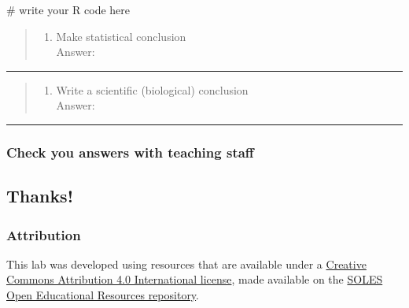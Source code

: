 \documentclass[
  10pt,
  letterpaper,
  DIV=11,
  numbers=noendperiod]{scrartcl}
\newenvironment{Shaded}{\begin{snugshade}}{\end{snugshade}}
\newcommand{\CommentTok}[1]{\textcolor[rgb]{0.37,0.37,0.37}{#1}}
\providecommand{\tightlist}{%
  \setlength{\itemsep}{0pt}\setlength{\parskip}{0pt}}\usepackage{longtable,booktabs,array}
\begin{document}
\begin{Shaded}
\begin{Highlighting}[]
\CommentTok{\# write your R code here}
\end{Highlighting}
\end{Shaded}

\begin{quote}
\begin{enumerate}
\def\labelenumi{\arabic{enumi}.}
\setcounter{enumi}{5}
\tightlist
\item
  Make statistical conclusion\\
  Answer:
\end{enumerate}
\end{quote}

\begin{center}\rule{0.5\linewidth}{0.5pt}\end{center}

\begin{quote}
\begin{enumerate}
\def\labelenumi{\arabic{enumi}.}
\setcounter{enumi}{6}
\tightlist
\item
  Write a scientific (biological) conclusion\\
  Answer:
\end{enumerate}
\end{quote}

\begin{center}\rule{0.5\linewidth}{0.5pt}\end{center}

\hypertarget{check-you-answers-with-teaching-staff}{%
\subsubsection{Check you answers with teaching
staff}\label{check-you-answers-with-teaching-staff}}

\hypertarget{thanks}{%
\subsection{Thanks!}\label{thanks}}

\hypertarget{attribution}{%
\subsubsection{Attribution}\label{attribution}}

This lab was developed using resources that are available under a
\href{http://creativecommons.org/licenses/by/4.0/}{Creative Commons
Attribution 4.0 International license}, made available on the
\href{https://github.com/usyd-soles-edu/}{SOLES Open Educational
Resources repository}.
\end{document}
